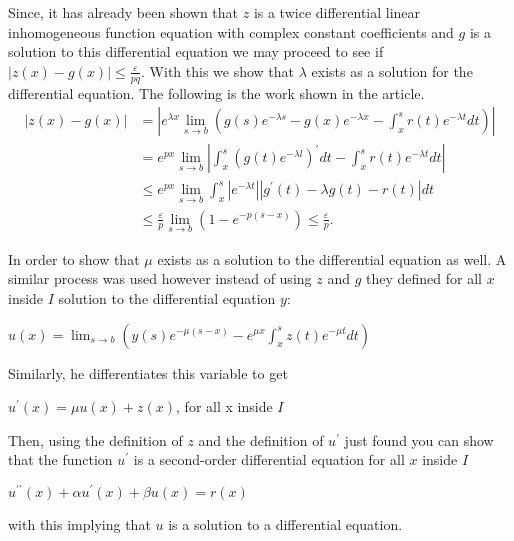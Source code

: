\documentclass[mla8]{mla}
\begin{document}
\begin{paper}
Since, it has already been shown that $\mathit{z}$ is a twice differential linear inhomogeneous function equation with complex constant coefficients and $\mathit{g}$ is a solution to this differential equation we may proceed to see if $|z(x) - g(x)| \leq \frac{\varepsilon}{p q}$. With this we show that $\lambda$ exists as a solution for the differential equation. The following is the work shown in the article.
$$\begin{aligned}
    |z(x)-g(x)| & =\left|e^{\lambda x} \lim _{s \rightarrow b}\left(g(s) e^{-\lambda s}-g(x) e^{-\lambda x}-\int_x^s r(t) e^{-\lambda t} d t\right)\right| \\ & =e^{p x} \lim _{s \rightarrow b}\left|\int_x^s\left(g(t) e^{-\lambda l}\right)^{\prime} d t-\int_x^s r(t) e^{-\lambda t} d t\right| \\ & \leq e^{p x} \lim _{s \rightarrow b} \int_x^s\left|e^{-\lambda t}\right|\left|g^{\prime}(t)-\lambda g(t)-r(t)\right| d t \\ & \leq \frac{\varepsilon}{p} \lim _{s \rightarrow b}\left(1-e^{-p(s-x)}\right) \leq \frac{\varepsilon}{p} .
\end{aligned}$$

In order to show that $\mu$ exists as a solution to the differential equation as well. A similar process was used however instead of using $z$ and $g$ they defined for all $x$ inside $I$ solution to the differential equation $y$:

\begin{center}
    $u(x)=\lim _{s \rightarrow b}\left(y(s) e^{-\mu(s-x)}-e^{\mu x} \int_x^s z(t) e^{-\mu t} d t\right)$
\end{center}
Similarly, he differentiates this variable to get

\begin{center}
    $u^\prime (x)= \mu u(x) + z(x)$, for all x inside $I$
\end{center}
 
Then, using the definition of $z$ and the definition of $u^\prime$ just found you can show that the function $u^\prime$ is a second-order differential equation for all $x$ inside $I$

\begin{center}
    $u^{\prime \prime}(x)+\alpha u^{\prime}(x)+\beta u(x)=r(x)$
\end{center}
with this implying that $u$ is a solution to a differential equation.


\end{paper}
\end{document}
